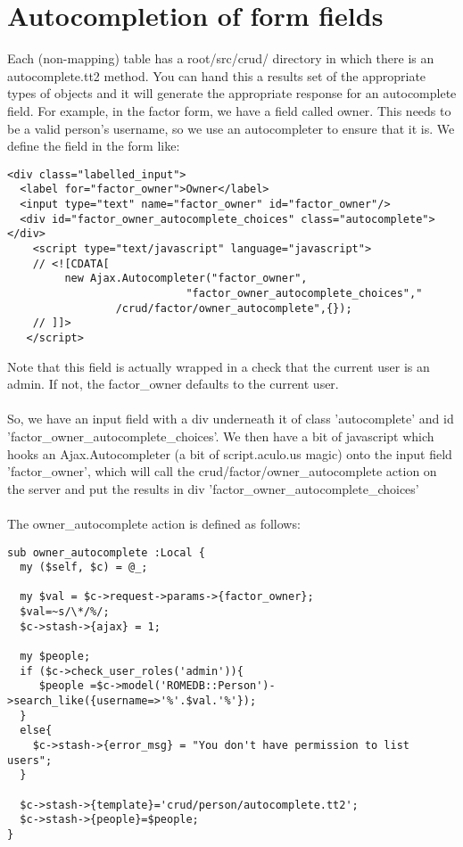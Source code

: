 \section{Autocompletion of form fields}
Each (non-mapping) table has a root/src/crud/ directory in which there is an autocomplete.tt2 method. You can hand this a results set of the appropriate types of objects and it will generate the appropriate response for an autocomplete field. For example, in the factor form, we have a field called owner. This needs to be a valid person's username, so we use an autocompleter to ensure that it is. We define the field in the form like:

\begin{verbatim}
<div class="labelled_input">
  <label for="factor_owner">Owner</label>
  <input type="text" name="factor_owner" id="factor_owner"/>
  <div id="factor_owner_autocomplete_choices" class="autocomplete"></div>
    <script type="text/javascript" language="javascript">
    // <![CDATA[
         new Ajax.Autocompleter("factor_owner",
	                        "factor_owner_autocomplete_choices","
				 /crud/factor/owner_autocomplete",{});
    // ]]>
   </script>
\end{verbatim}

Note that this field is actually wrapped in a check that the current user is an admin. If not, the factor\_owner defaults to the current user.

\paragraph*{}
So, we have an input field with a div underneath it of class 'autocomplete' and id 'factor\_owner\_autocomplete\_choices'. We then have a bit of javascript which hooks an Ajax.Autocompleter (a bit of script.aculo.us magic) onto the input field 'factor\_owner', which will call the crud/factor/owner\_autocomplete action on the server and put the results in div 'factor\_owner\_autocomplete\_choices' 

\paragraph*{}
The owner\_autocomplete action is defined as follows:

\begin{verbatim}
sub owner_autocomplete :Local {
  my ($self, $c) = @_;
  
  my $val = $c->request->params->{factor_owner};
  $val=~s/\*/%/;
  $c->stash->{ajax} = 1;

  my $people;
  if ($c->check_user_roles('admin')){
     $people =$c->model('ROMEDB::Person')->search_like({username=>'%'.$val.'%'});
  }
  else{
    $c->stash->{error_msg} = "You don't have permission to list users";
  }

  $c->stash->{template}='crud/person/autocomplete.tt2';
  $c->stash->{people}=$people;
}

\end{verbatim}


